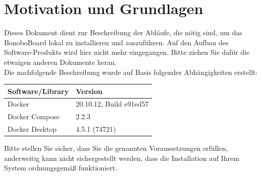 \documentclass[a4paper,11pt]{scrartcl}
\begin{document}
\section{Motivation und Grundlagen}\label{Grundlagen}
Dieses Dokument dient zur Beschreibung der Abläufe, die nötig sind, um das BonoboBoard lokal zu installieren und auszuführen. Auf den Aufbau des Software-Produkts wird hier nicht mehr eingegangen. Bitte ziehen Sie dafür die etwaigen anderen Dokumente heran.\\
Die nachfolgende Beschreibung wurde auf Basis folgender Abhängigkeiten erstellt:
\begin{table}[H]
\begin{tabular}{|p{5cm}|p{5cm}|}
\hline
\textbf{Software/Library} & \textbf{Version} \\ \hline
	Docker & 20.10.12, Build e91ed57 \\ \hline
	Docker Compose & 2.2.3\\ \hline
	Docker Desktop & 4.5.1 (74721)\\ \hline
\end{tabular}
\end{table}
\noindent
Bitte stellen Sie sicher, dass Sie die genannten Voraussetzungen erfüllen, anderweitig kann nicht sichergestellt werden, dass die Installation auf Ihrem System ordnungsgemäß funktioniert.\\
\end{document}

